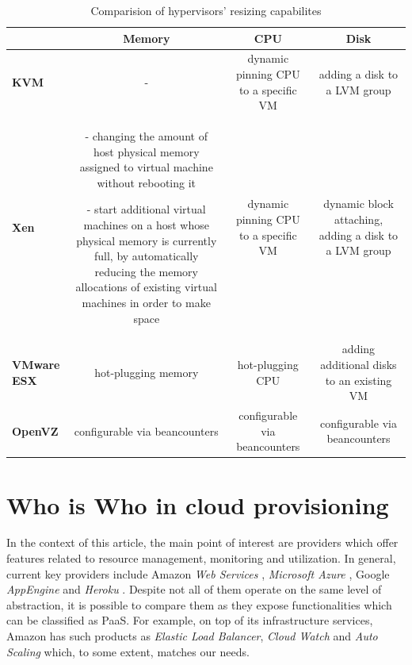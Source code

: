 \documentclass[twocolumn]{svjour3}          %
\begin{document}
\begin{table}[ht]
  \renewcommand{\arraystretch}{2}
  \begin{tabular}{p{4cm} | *{3}{C}}
     & \textbf{Memory} & \textbf{CPU} & \textbf{Disk} \\ \hline

   \textbf{KVM} & 
   - &
   dynamic pinning CPU to a specific VM \footnotemark[1] &
   adding a disk to a LVM group 
   \\ \hline

   \textbf{Xen} &
  - changing the amount of host physical memory assigned to virtual machine without rebooting it

  - start additional virtual machines on a host whose physical memory is currently full, by automatically reducing the memory allocations of existing virtual machines in order to make space &
  dynamic pinning CPU to a specific VM \footnotemark[1] &
  dynamic block attaching, adding a disk to a LVM group
  \\ \hline

  \textbf{VMware ESX} &
hot-plugging memory \footnotemark[2] & 
hot-plugging CPU \footnotemark[2]  &
adding additional disks to an existing VM
\\ \hline

\textbf{OpenVZ} & configurable via beancounters & configurable via beancounters & configurable via beancounters\\ \hline



\end{tabular}

\caption{Comparision of hypervisors' resizing capabilites}
\label{tab:hypervisors-resizing}

\end{table}


\section{Who is Who in cloud provisioning}
In the context of this article, the main point of interest are providers which offer features related to resource management, monitoring and utilization. In general, current key providers include Amazon \emph{Web Services} \cite{AWS}, \emph{Microsoft Azure} \cite{Azure}, Google \emph{AppEngine} \cite{GoogleAppEngine} and \emph{Heroku} \cite{Heroku}. Despite not all of them operate on the same level of abstraction, it is possible to compare them as they expose functionalities which can be classified as PaaS. For example, on top of its infrastructure services, Amazon has such products as \emph{Elastic Load Balancer}, \emph{Cloud Watch} and \emph{Auto Scaling} which, to some extent, matches our needs.
\end{document}
